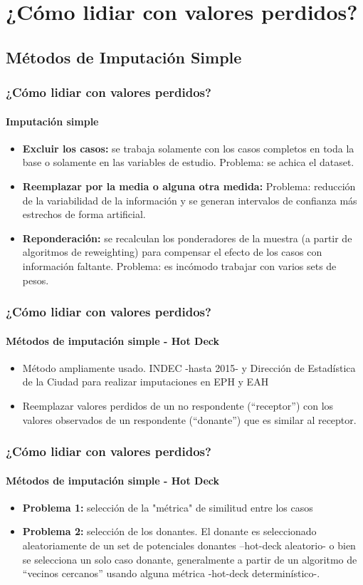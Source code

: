 \documentclass{beamer}
\begin{document}
\section{¿Cómo lidiar con valores perdidos?}
\subsection{Métodos de Imputación Simple}

\begin{frame}
	\frametitle{¿Cómo lidiar con valores perdidos?}
	\framesubtitle{Imputación simple}
		\begin{itemize}
			\item{\textbf{Excluir los casos:} se trabaja solamente con los casos completos en toda la base o solamente en las variables de estudio. Problema: se achica el dataset.}
			\item{\textbf{Reemplazar por la media o alguna otra medida:} Problema: reducción de la variabilidad de la información y se generan intervalos de confianza más estrechos de forma artificial.}
			\item{\textbf{Reponderación:} se recalculan los ponderadores de la muestra (a partir de algoritmos de reweighting) para compensar el efecto de los casos con información faltante. Problema: es incómodo trabajar con varios sets de pesos.}
			
		\end{itemize}
\end{frame}

\begin{frame}
	\frametitle{¿Cómo lidiar con valores perdidos?}
	\framesubtitle{Métodos de imputación simple - Hot Deck}
	\begin{itemize}
		\item{Método ampliamente usado. INDEC -hasta 2015- y Dirección de Estadística de la Ciudad para realizar imputaciones en EPH y EAH}
		\item{Reemplazar valores perdidos de un no respondente (“receptor”) con los valores observados de un respondente (“donante”) que es similar al receptor.}
	\end{itemize}
\end{frame}

\begin{frame}
	\frametitle{¿Cómo lidiar con valores perdidos?}
	\framesubtitle{Métodos de imputación simple - Hot Deck}
	\begin{itemize}
		\item{\textbf{Problema 1:} selección de la "métrica" de similitud entre los casos}
		\item{\textbf{Problema 2:} selección de los donantes}. {El donante es seleccionado aleatoriamente de un set de potenciales donantes –hot-deck aleatorio- o bien se selecciona un solo caso donante, generalmente a partir de un algoritmo de “vecinos cercanos” usando alguna métrica -hot-deck determinístico-.}
	\end{itemize}
\end{frame}
\end{document}
